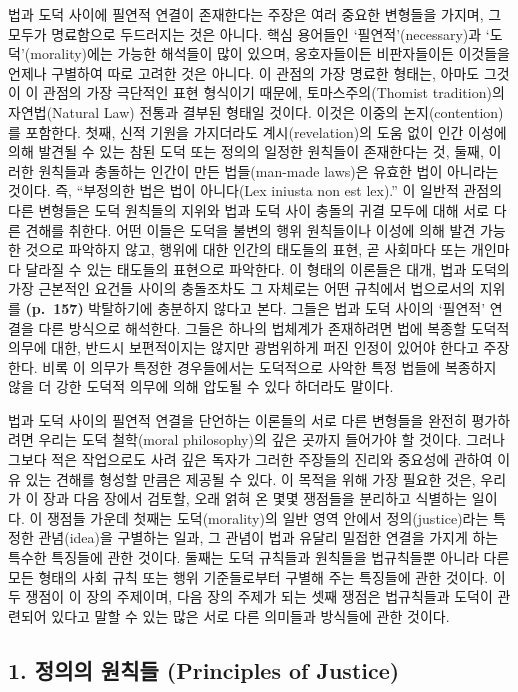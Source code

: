법과 도덕 사이에 필연적 연결이 존재한다는 주장은 여러 중요한 변형들을
가지며, 그 모두가 명료함으로 두드러지는 것은 아니다. 핵심 용어들인
‘필연적’(necessary)과 ‘도덕’(morality)에는 가능한 해석들이 많이 있으며,
옹호자들이든 비판자들이든 이것들을 언제나 구별하여 따로 고려한 것은
아니다. 이 관점의 가장 명료한 형태는, 아마도 그것이 이 관점의 가장
극단적인 표현 형식이기 때문에, 토마스주의(Thomist tradition)의
자연법(Natural Law) 전통과 결부된 형태일 것이다. 이것은 이중의
논지(contention)를 포함한다. 첫째, 신적 기원을 가지더라도
계시(revelation)의 도움 없이 인간 이성에 의해 발견될 수 있는 참된 도덕
또는 정의의 일정한 원칙들이 존재한다는 것, 둘째, 이러한 원칙들과
충돌하는 인간이 만든 법들(man-made laws)은 유효한 법이 아니라는 것이다.
즉, “부정의한 법은 법이 아니다(Lex iniusta non est lex).” 이 일반적
관점의 다른 변형들은 도덕 원칙들의 지위와 법과 도덕 사이 충돌의 귀결
모두에 대해 서로 다른 견해를 취한다. 어떤 이들은 도덕을 불변의 행위
원칙들이나 이성에 의해 발견 가능한 것으로 파악하지 않고, 행위에 대한
인간의 태도들의 표현, 곧 사회마다 또는 개인마다 달라질 수 있는 태도들의
표현으로 파악한다. 이 형태의 이론들은 대개, 법과 도덕의 가장 근본적인
요건들 사이의 충돌조차도 그 자체로는 어떤 규칙에서 법으로서의 지위를
\textbf{(p.~157)} 박탈하기에 충분하지 않다고 본다. 그들은 법과 도덕
사이의 ‘필연적’ 연결을 다른 방식으로 해석한다. 그들은 하나의 법체계가
존재하려면 법에 복종할 도덕적 의무에 대한, 반드시 보편적이지는 않지만
광범위하게 퍼진 인정이 있어야 한다고 주장한다. 비록 이 의무가 특정한
경우들에서는 도덕적으로 사악한 특정 법들에 복종하지 않을 더 강한 도덕적
의무에 의해 압도될 수 있다 하더라도 말이다.

법과 도덕 사이의 필연적 연결을 단언하는 이론들의 서로 다른 변형들을
완전히 평가하려면 우리는 도덕 철학(moral philosophy)의 깊은 곳까지
들어가야 할 것이다. 그러나 그보다 적은 작업으로도 사려 깊은 독자가
그러한 주장들의 진리와 중요성에 관하여 이유 있는 견해를 형성할 만큼은
제공될 수 있다. 이 목적을 위해 가장 필요한 것은, 우리가 이 장과 다음
장에서 검토할, 오래 얽혀 온 몇몇 쟁점들을 분리하고 식별하는 일이다. 이
쟁점들 가운데 첫째는 도덕(morality)의 일반 영역 안에서 정의(justice)라는
특정한 관념(idea)을 구별하는 일과, 그 관념이 법과 유달리 밀접한 연결을
가지게 하는 특수한 특징들에 관한 것이다. 둘째는 도덕 규칙들과 원칙들을
법규칙들뿐 아니라 다른 모든 형태의 사회 규칙 또는 행위 기준들로부터
구별해 주는 특징들에 관한 것이다. 이 두 쟁점이 이 장의 주제이며, 다음
장의 주제가 되는 셋째 쟁점은 법규칙들과 도덕이 관련되어 있다고 말할 수
있는 많은 서로 다른 의미들과 방식들에 관한 것이다.

\subsection{1. 정의의 원칙들 (Principles of
Justice)}\label{uxc815uxc758uxc758-uxc6d0uxce59uxb4e4-principles-of-justice}

